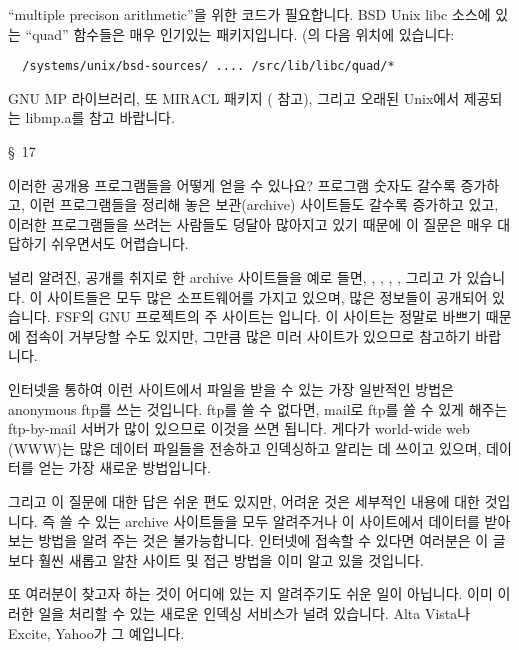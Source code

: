 \begin{faq}
	``multiple precison arithmetic''을 위한 코드가 필요합니다.
\A
	BSD Unix libc 소스에 있는 ``quad'' 함수들은 매우 인기있는 패키지입니다.
	(의 다음 위치에 있습니다:
\begin{verbatim}
  /systems/unix/bsd-sources/ .... /src/lib/libc/quad/*
\end{verbatim}
	\noindent GNU MP 라이브러리, 또 MIRACL 패키지
	( 참고), 그리고 오래된 Unix에서
	제공되는 libmp.a를 참고 바랍니다.  

\R
	\cite{swsolution} \S\ 17 
\end{faq}

\begin{faq}
	이러한 공개용 프로그램들을 어떻게 얻을 수 있나요?
\A
	프로그램 숫자도 갈수록 증가하고, 이런 프로그램들을 정리해 놓은 
	보관(archive) 사이트들도 갈수록 증가하고 있고, 이러한 프로그램들을
	쓰려는 사람들도 덩달아 많아지고 있기 때문에 
	이 질문은 매우 대답하기 쉬우면서도 어렵습니다.

	널리 알려진, 공개를 취지로 한 archive 사이트들을 예로 들면,
	, , ,
	, 그리고 가
	있습니다.  이 사이트들은 모두 많은 소프트웨어를 가지고 있으며,
	많은 정보들이 공개되어 있습니다.
	FSF의 GNU 프로젝트의 주 사이트는 입니다.
	이 사이트는 정말로 바쁘기 때문에 접속이 거부당할 수도 있지만,
	그만큼 많은 미러 사이트가 있으므로 참고하기 바랍니다.

	인터넷을 통하여
	이런 사이트에서 파일을 받을 수 있는 가장 일반적인 방법은 
	anonymous ftp를 쓰는 것입니다.  ftp를 쓸 수 없다면, mail로
	ftp를 쓸 수 있게 해주는 ftp-by-mail 서버가 많이 있으므로
	이것을 쓰면 됩니다.  게다가 world-wide web (WWW)는 
	많은 데이터 파일들을 전송하고 인덱싱하고 알리는 데 쓰이고
	있으며, 데이터를 얻는 가장 새로운 방법입니다.

	그리고 이 질문에 대한 답은 쉬운 편도 있지만, 어려운 것은
	세부적인 내용에 대한 것입니다.  즉 쓸 수 있는 archive 사이트들을
	모두 알려주거나 이 사이트에서 데이터를 받아보는 방법을 알려
	주는 것은 불가능합니다.  인터넷에 접속할 수 있다면 여러분은 이
	글보다 훨씬 새롭고 알찬 사이트 및 접근 방법을 이미 알고 있을
	것입니다.

	또 여러분이 찾고자 하는 것이 어디에 있는 지 알려주기도 쉬운
	일이 아닙니다.  이미 이러한 일을 처리할 수 있는 새로운 인덱싱
	서비스가 널려 있습니다.  Alta Vista나 Excite, Yahoo가 그 예입니다.


\end{faq}
